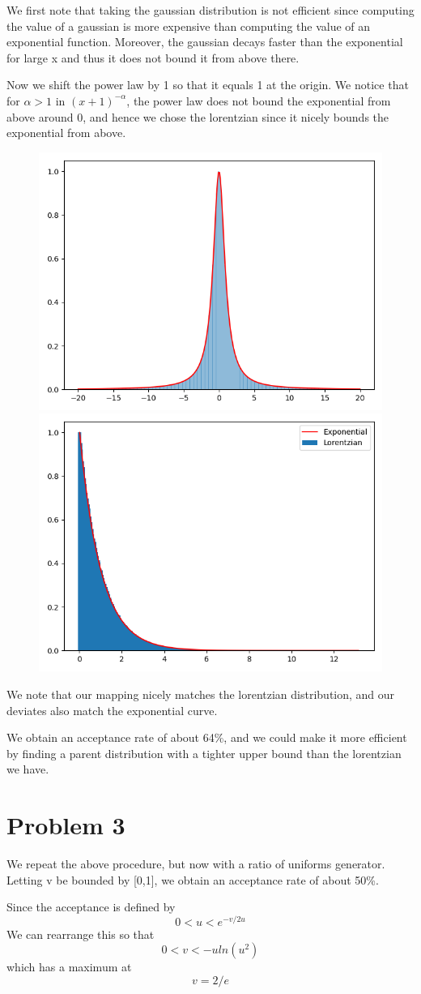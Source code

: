 \documentclass[]{article}
\begin{document}
We first note that taking the gaussian distribution is not efficient since computing the value of a gaussian is more expensive than computing the value of an exponential function. Moreover, the gaussian decays faster than the exponential for large x and thus it does not bound it from above there.

Now we shift the power law by 1 so that it equals 1 at the origin. We notice that for $\alpha > 1$ in $(x + 1)^{-\alpha}$, the power law does not bound the exponential from above around 0, and hence we chose the lorentzian since it nicely bounds the exponential from above.
\begin{figure}[h!]
	\centering
	\includegraphics[width=0.45\linewidth]{Results/q2b.png}
	\includegraphics[width=0.45\linewidth]{Results/q2c.png}
\end{figure}

We note that our mapping nicely matches the lorentzian distribution, and our deviates also match the exponential curve.

We obtain an acceptance rate of about 64\%, and we could make it more efficient by finding a parent distribution with a tighter upper bound than the lorentzian we have.

\newpage
\section{Problem 3}
We repeat the above procedure, but now with a ratio of uniforms generator. Letting v be bounded by [0,1], we obtain an acceptance rate of about 50\%.

Since the acceptance is defined by
\begin{equation}
	0<u<e^{-v/2u}
\end{equation}
We can rearrange this so that
\begin{equation}
	0<v< -u ln(u^2)
\end{equation}
which has a maximum at
$$v = 2/e$$
\end{document}
